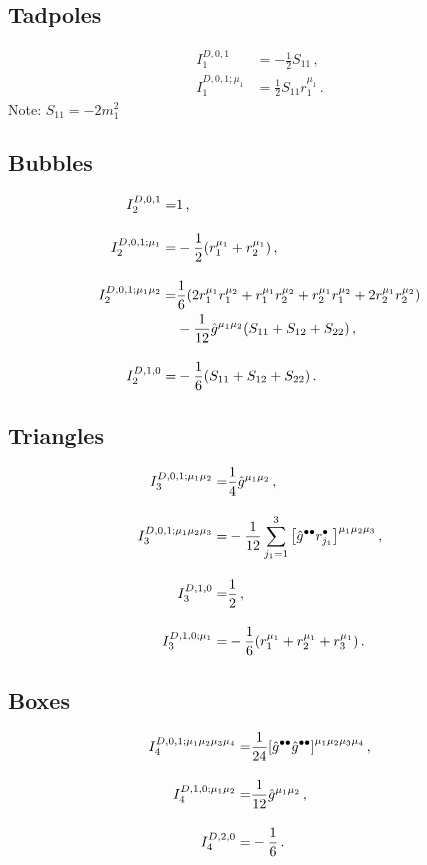 \subsection*{Tadpoles}
\begin{subequations}
\begin{align}
  I_1^{D,0,1} &= -\frac{1}{2}S_{11}\,,\\[10pt]
%
  I_1^{D,0,1;\mu_1} &= \frac{1}{2}S_{11}r_1^{\mu_1}\,.
\end{align}
\end{subequations}
Note: $S_{11}=-2m_1^2$

\subsection*{Bubbles}
\begin{subequations}
\begin{align}
    I_2^{D,0,1} =& 1\,,\\[10pt]
%
    I_2^{D,0,1;\mu_1} =& -\frac{1}{2}\qty(r_1^{\mu_1}+r_2^{\mu_1})\,,\\[10pt]
%
    I_2^{D,0,1;\mu_1\mu_2} =& \frac{1}{6}\qty(2r_1^{\mu_1}r_1^{\mu_2}+r_1^{\mu_1}r_2^{\mu_2}+r_2^{\mu_1}r_1^{\mu_2}+2r_2^{\mu_1}r_2^{\mu_2})\notag\\
      &-\frac{1}{12}\hat{g}^{\mu_1\mu_2}\qty(S_{11}+S_{12}+S_{22})\,,\\[10pt]
%
    I_2^{D,1,0} =& -\frac{1}{6}\qty(S_{11}+S_{12}+S_{22})\,.
\end{align}
\end{subequations}

\subsection*{Triangles}
\begin{subequations}
\begin{align}
  I_3^{D,0,1;\mu_1\mu_2} =& \frac{1}{4}\hat{g}^{\mu_1\mu_2}\,,\\[10pt]
%
  I_3^{D,0,1;\mu_1\mu_2\mu_3} =& -\frac{1}{12}\sum_{j_1=1}^3\qty[\hat{g}^{\bullet\bullet}r_{j_1}^\bullet]^{\mu_1\mu_2\mu_3}\,,\\[10pt]
%
  I_3^{D,1,0} =& \frac{1}{2}\,,\\[10pt]
%
  I_3^{D,1,0;\mu_1} =& -\frac{1}{6}\qty(r_1^{\mu_1}+r_2^{\mu_1}+r_3^{\mu_1})\,.
\end{align}
\end{subequations}

\subsection*{Boxes}
\begin{subequations}
\begin{align}
  I_4^{D,0,1;\mu_1\mu_2\mu_3\mu_4} =& \frac{1}{24}\qty[\hat{g}^{\bullet\bullet}\hat{g}^{\bullet\bullet}]^{\mu_1\mu_2\mu_3\mu_4}\,,\\[10pt]
%
  I_4^{D,1,0;\mu_1\mu_2} =& \frac{1}{12}\hat{g}^{\mu_1\mu_2}\,,\\[10pt]
%
  I_4^{D,2,0} =& -\frac{1}{6}\,.
\end{align}
\end{subequations}

